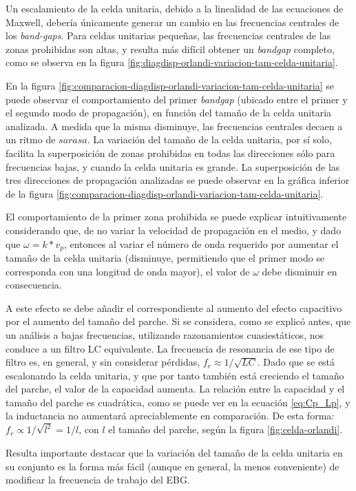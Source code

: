 Un escalamiento de la celda unitaria, debido a la linealidad de las ecuaciones de Maxwell, debería únicamente generar un cambio en las frecuencias centrales de los \textit{band-gaps}. Para celdas unitarias pequeñas, las frecuencias centrales de las zonas prohibidas son altas, y resulta más difícil obtener un \textit{bandgap} completo, como se observa en la figura \ref{fig:diagdisp-orlandi-variacion-tam-celda-unitaria}.

En la figura \ref{fig:comparacion-diagdisp-orlandi-variacion-tam-celda-unitaria} se puede observar el comportamiento del primer \textit{bandgap} (ubicado entre el primer y el segundo modo de propagación), en función del tamaño de la celda unitaria analizada. A medida que la misma disminuye, las frecuencias centrales decaen a un ritmo de $sarasa$. La variación del tamaño de la celda unitaria, por sí solo, facilita la superposición de zonas prohibidas en todas las direcciones sólo para frecuencias bajas, y cuando la celda unitaria es grande. La superposición de las tres direcciones de propagación analizadas se puede observar en la gráfica inferior de la figura \ref{fig:comparacion-diagdisp-orlandi-variacion-tam-celda-unitaria}.

El comportamiento de la primer zona prohibida se puede explicar intuitivamente considerando que, de no variar la velocidad de propagación en el medio, y dado que $\omega =k*v_p$, entonces al variar el número de onda requerido por aumentar el tamaño de la celda unitaria (disminuye, permitiendo que el primer modo se corresponda con una longitud de onda mayor), el valor de $\omega$ debe disminuir en consecuencia.

A este efecto se debe añadir el correspondiente al aumento del efecto capacitivo por el aumento del tamaño del parche. Si se considera, como se explicó antes, que un análisis a bajas frecuencias, utilizando razonamientos cuasiestáticos, nos conduce a un filtro LC equivalente. La frecuencia de resonancia de ese tipo de filtro es, en general, y sin considerar pérdidas, $f_r \approx 1/\sqrt{LC}$. Dado que se está escalonando la celda unitaria, y que por tanto también está creciendo el tamaño del parche, el valor de la capacidad aumenta. La relación entre la capacidad y el tamaño del parche es cuadrática, como se puede ver en la ecuación \ref{eq:Cp_Lp}, y la inductancia no aumentará apreciablemente en comparación. De esta forma: $f_r \propto 1/\sqrt{l^2} = 1/l$, con $l$ el tamaño del parche, según la figura \ref{fig:celda-orlandi}.

Resulta importante destacar que la variación del tamaño de la celda unitaria en su conjunto es la forma más fácil (aunque en general, la menos conveniente) de modificar la frecuencia de trabajo del EBG.

